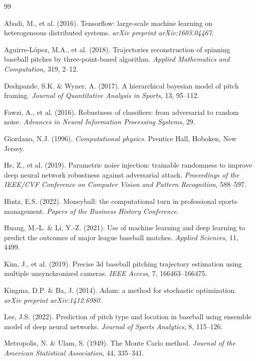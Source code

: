 \documentclass[12pt,a4paper]{article}
\begin{document}
\begin{thebibliography}{99}

Abadi, M., et al. (2016). Tensorflow: large-scale machine learning on heterogeneous distributed systems. \textit{arXiv preprint arXiv:1603.04467}.

Aguirre-López, M.A., et al. (2018). Trajectories reconstruction of spinning baseball pitches by three-point-based algorithm. \textit{Applied Mathematics and Computation}, 319, 2--12.

Deshpande, S.K. \& Wyner, A. (2017). A hierarchical bayesian model of pitch framing. \textit{Journal of Quantitative Analysis in Sports}, 13, 95--112.

Fawzi, A., et al. (2016). Robustness of classifiers: from adversarial to random noise. \textit{Advances in Neural Information Processing Systems}, 29.

Giordano, N.J. (1996). \textit{Computational physics}. Prentice Hall, Hoboken, New Jersey.

He, Z., et al. (2019). Parametric noise injection: trainable randomness to improve deep neural network robustness against adversarial attack. \textit{Proceedings of the IEEE/CVF Conference on Computer Vision and Pattern Recognition}, 588--597.

Hintz, E.S. (2022). Moneyball: the computational turn in professional sports management. \textit{Papers of the Business History Conference}.

Huang, M.-L. \& Li, Y.-Z. (2021). Use of machine learning and deep learning to predict the outcomes of major league baseball matches. \textit{Applied Sciences}, 11, 4499.

Kim, J., et al. (2019). Precise 3d baseball pitching trajectory estimation using multiple unsynchronized cameras. \textit{IEEE Access}, 7, 166463--166475.

Kingma, D.P. \& Ba, J. (2014). Adam: a method for stochastic optimization. \textit{arXiv preprint arXiv:1412.6980}.

Lee, J.S. (2022). Prediction of pitch type and location in baseball using ensemble model of deep neural networks. \textit{Journal of Sports Analytics}, 8, 115--126.

Metropolis, N. \& Ulam, S. (1949). The Monte Carlo method. \textit{Journal of the American Statistical Association}, 44, 335--341.


\end{thebibliography}
\end{document}

